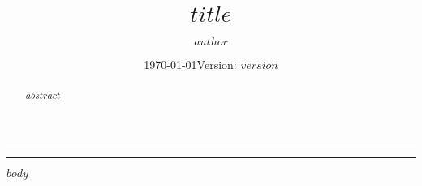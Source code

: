 \documentclass[12pt]{article}
\title{$title$}
\author{$author$}
\date{\today \hfill Version: \texttt{$version$}}
\begin{document}
\maketitle

\begin{abstract}
$abstract$
\end{abstract}

\noindent\rule{\textwidth}{0.4pt}  %

\tableofcontents  %
\noindent\rule{\textwidth}{0.4pt}  %

\bigskip  %

$body$
\end{document}
